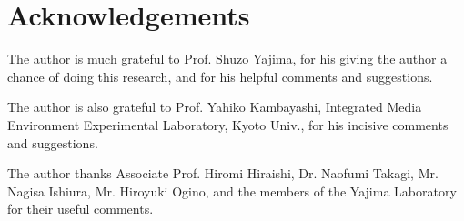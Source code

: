\section*{Acknowledgements}
The author is much grateful to Prof. Shuzo Yajima, for his giving the
author a chance of doing this research, and for his helpful comments and
suggestions.

The author is also grateful to Prof. Yahiko Kambayashi, Integrated Media
Environment Experimental Laboratory, Kyoto Univ., for his incisive
comments and suggestions.

The author thanks Associate Prof. Hiromi Hiraishi, Dr. Naofumi Takagi, 
Mr. Nagisa Ishiura, Mr. Hiroyuki Ogino, and the members of the Yajima 
Laboratory for their useful comments. 
